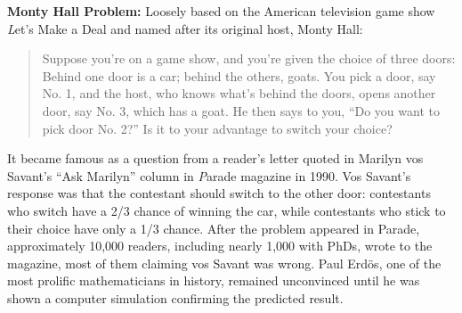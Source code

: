 \documentclass[twoside,11pt,a4paper]{article}
\newif\ifEN \ENtrue	                %
\def\tr|#1|#2|{\ifEN #2\else #1\fi}     %
\theoremstyle{definition}
\newcounter{exc}
\def\answerline#1{%
   \ifhmode\\[1ex]\fcolorbox{solbox}{solbox}{\hbox to \linewidth{\vbox to #1\baselineskip{}}}%
   \else\fcolorbox{solbox}{solbox}{\hbox to \linewidth{\vbox to #1\baselineskip{}}}%
   \fi
 }
\def\xwrap#1#2{\parbox{\textwidth}{#2\vspace{#1\textheight}}}
\begin{document}
\xwrap{0}{
\begin{exc}
  \textbf{Monty Hall Problem:}
  \tr|Basierend auf der amerikanischen Fernsehshow \emph{Let's Make a Deal} und benannt nach dessen Showmaster,
      Monty Hall:
     |Loosely based on the American television game show \emph{Let's Make a Deal} and named after its original
      host, Monty Hall:|
  \begin{quote}
    \tr|Sie nehmen an einer Spielshow teil und k"onnen eine von drei T"uren ausw"ahlen.
    Hinter einer T"ure ist ein Auto, hinter den anderen Ziegen.
    Sie w"ahlen eine T"ure, z.B. Nr. 1 und der Showmaster (der weiss was sich hinter welcher T"ure
    verbirgt) "offnet eine andere T"ure, z.B. Nr. 3 hinter der eine Ziege steckt. Und dann fragt er: 
    ``M"ochten Sie lieber T"ure Nr. 2 "offnen?''.
    Ist es besser zu wechseln oder spielt das keine Rolle?
   |Suppose you're on a game show, and you're given the choice of three doors:
    Behind one door is a car; behind the others, goats.
    You pick a door, say No. 1, and the host, who knows what's behind the doors, opens another door, 
    say No. 3, which has a goat.
    He then says to you, ``Do you want to pick door No. 2?'' Is it to your advantage to switch your choice?|
  \end{quote}
\end{exc}
\begin{Answer}
  \tr|Das Problem wurde ber"uhmt durch einen Leserbrief in Marilyn vos Savants Kolummne ``Ask Marilyn''
  im \emph{Parade} Magazin im Jahre 1990.
  Vos Savants Antowrt war, dass der Teilnehmer die T"ure wechseln sollte, weil sich dann seine
  Gewinnchancen verdoppeln.
  Daraufhin gingen ca. 10000 Leserbriefe bei \emph{Parade} ein (und fast 1000 davon von Lesern
  mit einem  Doktortitel), von denen die meisten behaupteten, dass vos Savants sich irre,
  Paul Erd"os, einer der bekanntesten Mathematiker seiner Zeit, liess sich erst von einer
  Computersimulation "uberzeugen. 
  |It became famous as a question from a reader's letter quoted in Marilyn vos Savant's ``Ask Marilyn''
  column in \emph{Parade} magazine in 1990. 
  Vos Savant's response was that the contestant should switch to the other door:
  contestants who switch have a 2/3 chance of winning the car, 
  while contestants who stick to their choice have only a 1/3 chance.
  After the problem appeared in Parade, approximately 10,000 readers,
  including nearly 1,000 with PhDs,
  wrote to the magazine, most of them claiming vos Savant was wrong. 
  Paul Erd\"os, one of the most prolific mathematicians in history,
  remained unconvinced until he was shown a computer simulation confirming the predicted result.|
\end{Answer}
\answerline{5}}
\end{document}
